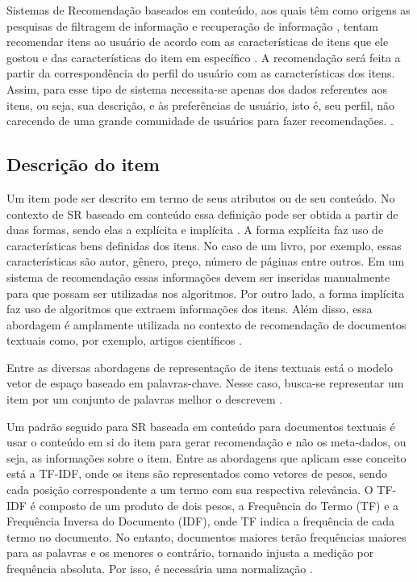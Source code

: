     Sistemas de Recomendação baseados em conteúdo, aos quais têm como origens as pesquisas de filtragem de informação e recuperação de informação \cite{Cazella2010}, tentam recomendar itens ao usuário de acordo com as características de itens que ele gostou e das características do item em específico \cite{Ricci2010}. A recomendação será feita a partir da correspondência do perfil do usuário com as características dos itens. Assim, para esse tipo de sistema necessita-se apenas dos dados referentes aos itens, ou seja, sua descrição, e às preferências de usuário, isto é, seu perfil, não carecendo de uma grande comunidade de usuários para fazer recomendações. \cite{Jannach2010}. 

    \subsection{Descrição do item}
   
    Um item pode ser descrito em termo de seus atributos ou de seu conteúdo. No contexto de SR baseado em conteúdo essa definição pode ser obtida a partir de duas formas, sendo elas a explícita e implícita \cite{Jannach2010}. A forma explícita faz uso de características bens definidas dos itens. No caso de um livro, por exemplo, essas características são autor, gênero, preço, número de páginas entre outros. Em um sistema de recomendação essas informações devem ser inseridas manualmente para que possam ser utilizadas nos algoritmos. Por outro lado, a forma implícita faz uso de algoritmos que extraem informações dos itens. Além disso, essa abordagem é amplamente utilizada no contexto de recomendação de documentos textuais como, por exemplo, artigos científicos \cite{Garcia2013}.
    
    
    Entre as diversas abordagens de representação de itens textuais está o modelo vetor de espaço baseado em palavras-chave. Nesse caso, busca-se representar um item por um conjunto de palavras melhor o descrevem \cite{Jannach2010}.
    
    Um padrão seguido para SR baseada em conteúdo para documentos textuais é usar o conteúdo em si do item para gerar recomendação e não os meta-dados, ou seja, as informações sobre o item. Entre as abordagens que aplicam esse conceito está a TF-IDF, onde os itens são representados como vetores de pesos, sendo cada posição correspondente a um termo com sua respectiva relevância. 
    O TF-IDF é composto de um produto de dois pesos, a Frequência do Termo (TF) e a Frequência Inversa do Documento (IDF), onde TF indica a frequência de cada termo no documento. No entanto, documentos maiores terão frequências maiores para as palavras e os menores o contrário, tornando injusta a medição por frequência absoluta. Por isso, é necessária uma normalização \cite{Jannach2010}. 
    

